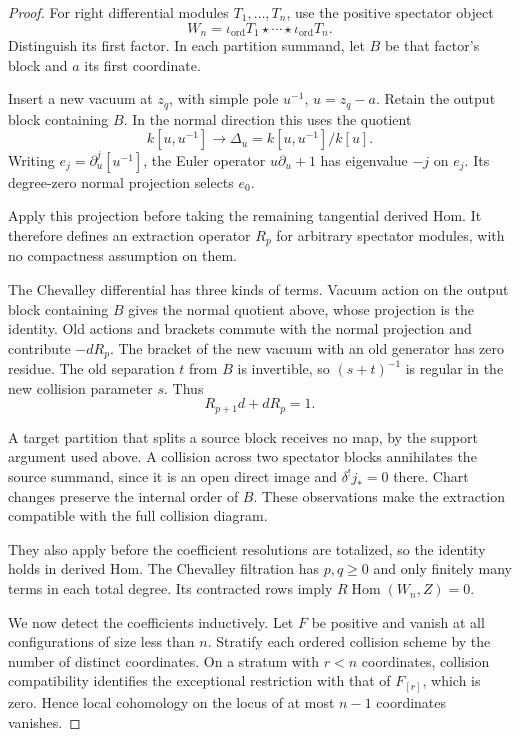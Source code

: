 \begin{proof}
For right differential modules
$T_1,\ldots,T_n$, use the
positive spectator object
\[
 W_n=\iota_{\mathrm{ord}}T_1
       \star\cdots\star
       \iota_{\mathrm{ord}}T_n.
\]
Distinguish its first factor.
In each partition summand,
let $B$ be that factor's
block and $a$ its first
coordinate.

Insert a new vacuum at
$z_q$, with simple pole
$u^{-1}$, $u=z_q-a$.
Retain the output block
containing $B$. In the
normal direction this uses
the quotient
\[
 k[u,u^{-1}]\longrightarrow
 \Delta_u=k[u,u^{-1}]/k[u].
\]
Writing $e_j=\partial_u^j[u^{-1}]$,
the Euler operator
$u\partial_u+1$ has eigenvalue
$-j$ on $e_j$.
Its degree-zero normal
projection selects $e_0$.

Apply this projection before
taking the remaining tangential
derived Hom. It therefore
defines an extraction operator
$R_p$ for arbitrary spectator
modules, with no compactness
assumption on them.

The Chevalley differential
has three kinds of terms.
Vacuum action on the output
block containing $B$ gives
the normal quotient above,
whose projection is the
identity. Old actions and
brackets commute with the
normal projection and
contribute $-dR_p$.
The bracket of the new vacuum with an old generator has zero
residue. The old separation $t$ from $B$ is invertible, so
$(s+t)^{-1}$ is regular in the new collision parameter $s$.
Thus
\[
 R_{p+1}d+dR_p=1.
\]

A target partition that
splits a source block
receives no map, by the
support argument used
above. A collision across
two spectator blocks
annihilates the source
summand, since it is an
open direct image and
$\delta^!j_*=0$ there.
Chart changes preserve
the internal order of $B$.
These observations make
the extraction compatible
with the full collision
diagram.

They also apply
before the coefficient
resolutions are totalized,
so the identity holds in
derived Hom.
The Chevalley filtration
has $p,q\geq0$ and only
finitely many terms in
each total degree.
Its contracted rows imply
$R\operatorname{Hom}(W_n,Z)=0$.

We now detect the coefficients
inductively. Let $F$ be
positive and vanish at
all configurations of size
less than $n$. Stratify
each ordered collision
scheme by the number of
distinct coordinates.
On a stratum with $r<n$
coordinates, collision
compatibility identifies
the exceptional restriction
with that of $F_{[r]}$,
which is zero. Hence
local cohomology on the
locus of at most $n-1$
coordinates vanishes.


\end{proof}
